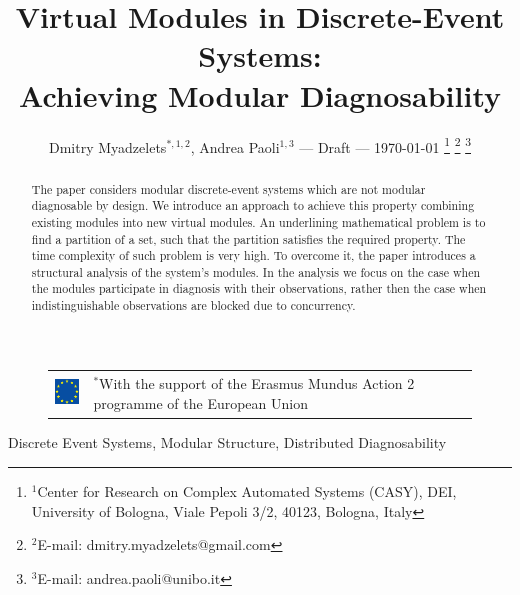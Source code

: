 \documentclass[letterpaper, 10pt, conference]{ieeeconf}
\begin{document}
\title{Virtual Modules in Discrete-Event Systems: \\ Achieving
Modular Diagnosability} \author{Dmitry Myadzelets$^{*,1,2}$, Andrea
Paoli$^{1,3}$  
--- Draft --- \today
\thanks{$^{1}$Center for Research on Complex Automated Systems (CASY), DEI,
University of Bologna, Viale Pepoli 3/2, 40123, Bologna, Italy}
	\thanks{$^{2}$E-mail: {dmitry.myadzelets@gmail.com}}
	\thanks{$^{3}$E-mail: {andrea.paoli@unibo.it}}
}
\maketitle

\begin{figure}[!b]
\begin{tabular}{l p{60mm}}
 	\includegraphics[height=10mm]{EU_flag.eps}
 	& \vspace{-10mm} \footnotesize
 	$^{*}$With the support of the Erasmus Mundus Action 2 programme of the
 	European Union
\end{tabular}
\end{figure}

\begin{abstract}
The paper considers modular discrete-event systems which are not modular
diagnosable by design. We introduce an approach to achieve this property
combining existing modules into new virtual modules. An underlining mathematical
problem is to find a partition of a set, such that the partition satisfies the
required property. The time complexity of such problem is very high.
To overcome it, the paper introduces a structural analysis of the system's
modules. In the analysis we focus on the case when the modules participate in
diagnosis with their observations, rather then the case when indistinguishable
observations are blocked due to concurrency.
\end{abstract}

\begin{keywords}
Discrete Event Systems, Modular Structure, Distributed Diagnosability
\end{keywords}
\end{document}
